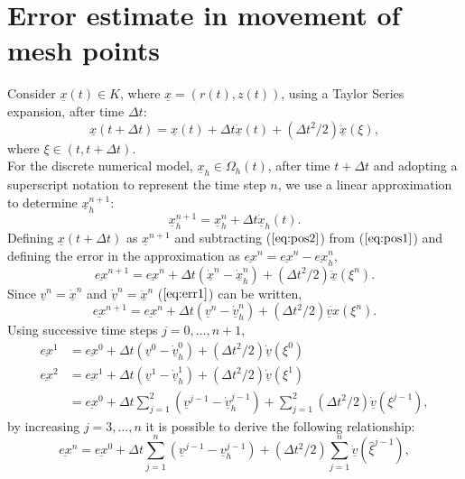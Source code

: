 \documentclass[11pt]{article}
\newcommand{\D}{\Delta}
\newcommand{\ul}{\underline}
\begin{document}
\section{Error estimate in movement of mesh points}
Consider $\ul{x}(t) \in K$, where $\ul{x} = (r(t),z(t))$, using a Taylor Series expansion, after time $\D{t}$:
\begin{equation}
\label{eq:pos1}
\ul{x}(t+\D{t}) = \ul{x}(t) + \D{t}\dot{\ul{x}}(t) +( \D{t}^2/2)\ddot{\ul{x}}(\xi),
\end{equation}
where $\xi \in (t, t+\D{t})$.\\
For the discrete numerical model, $\ul{x}_h \in \Omega_h(t)$, after time $t + \D{t}$ and adopting a superscript notation to represent the time step $n$, we use a linear approximation to determine $\ul{x}_h^{n+1}$:
\begin{equation}
\label{eq:pos2}
\ul{x}_h^{n+1} = \ul{x}_h^n + \D{t}\dot{\ul{x}}_h(t).
\end{equation}
Defining $\ul{x}(t+\D{t})$ as $\ul{x}^{n+1}$ and subtracting ($\ref{eq:pos2}$) from ($\ref{eq:pos1}$) and defining the error in the approximation as $\ul{ex}^n = \ul{ex}^n - \ul{ex}_h^n$,
\begin{equation}
\label{eq:err1}
\ul{ex}^{n+1} = \ul{ex}^n + \D{t}(\dot{\ul{x}}^n-\dot{\ul{x}}_h^n) + ( \D{t}^2/2)\ddot{\ul{x}}(\xi^n).
\end{equation}
Since $\ul{v}^n = \dot{\ul{x}}^n$ and $\dot{\ul{v}}^n = \ddot{\ul{x}}^n$ ($\ref{eq:err1}$) can be written,
\begin{equation}
\label{eq:err2}
\ul{ex}^{n+1} = \ul{ex}^n + \D{t}({\ul{v}}^n-\dot{\ul{v}}_h^n) + ( \D{t}^2/2)\dot{\ul{v}{x}}(\xi^n).
\end{equation}
Using successive time steps $j = 0,\dots,n+1$, 
\begin{equation*}
     \begin{aligned}
     \ul{ex}^{1}  & = \ul{ex}^0 + \D{t}({\ul{v}}^0-\dot{\ul{v}}_h^0) + ( \D{t}^2/2)\dot{\ul{v}}(\xi^0) \\
     \ul{ex}^{2} & = \ul{ex}^1 + \D{t}({\ul{v}}^1-\dot{\ul{v}}_h^1) + ( \D{t}^2/2)\dot{\ul{v}}(\xi^1)\\
     &= \ul{ex}^0 + \D{t} \sum_{j=1}^2({\ul{v}}^{j-1}-\dot{\ul{v}}_h^{j-1}) + \sum_{j=1}^2( \D{t}^2/2)\dot{\ul{v}}(\xi^{j-1}),
      \end{aligned}
\end{equation*}
by increasing ${j = 3,\dots,n}$ it is possible to derive the following relationship:
\begin{equation}
\label{eq:err2}
\ul{ex}^{n} = \ul{ex}^0 + \D{t}\sum_{j=1}^{n}(\ul{v}^{j-1}-\ul{v}_h^{j-1}) + ( \D{t}^2/2)\sum_{j=1}^{n}\dot{\ul{v}}(\hat{\xi}^{j-1}),
\end{equation}
\end{document}
